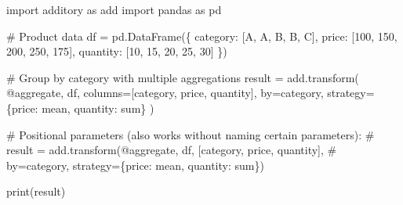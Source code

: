 \documentclass[
  letterpaper,
]{scrbook}
\newenvironment{Shaded}{\begin{snugshade}}{\end{snugshade}}
\newcommand{\BuiltInTok}[1]{\textcolor[rgb]{0.00,0.23,0.31}{#1}}
\newcommand{\CommentTok}[1]{\textcolor[rgb]{0.37,0.37,0.37}{#1}}
\newcommand{\DecValTok}[1]{\textcolor[rgb]{0.68,0.00,0.00}{#1}}
\newcommand{\ImportTok}[1]{\textcolor[rgb]{0.00,0.46,0.62}{#1}}
\newcommand{\NormalTok}[1]{\textcolor[rgb]{0.00,0.23,0.31}{#1}}
\newcommand{\OperatorTok}[1]{\textcolor[rgb]{0.37,0.37,0.37}{#1}}
\newcommand{\StringTok}[1]{\textcolor[rgb]{0.13,0.47,0.30}{#1}}
\begin{document}
\begin{Shaded}
\begin{Highlighting}[]
\ImportTok{import}\NormalTok{ additory }\ImportTok{as}\NormalTok{ add}
\ImportTok{import}\NormalTok{ pandas }\ImportTok{as}\NormalTok{ pd}

\CommentTok{\# Product data}
\NormalTok{df }\OperatorTok{=}\NormalTok{ pd.DataFrame(\{}
    \StringTok{\textquotesingle{}category\textquotesingle{}}\NormalTok{: [}\StringTok{\textquotesingle{}A\textquotesingle{}}\NormalTok{, }\StringTok{\textquotesingle{}A\textquotesingle{}}\NormalTok{, }\StringTok{\textquotesingle{}B\textquotesingle{}}\NormalTok{, }\StringTok{\textquotesingle{}B\textquotesingle{}}\NormalTok{, }\StringTok{\textquotesingle{}C\textquotesingle{}}\NormalTok{],}
    \StringTok{\textquotesingle{}price\textquotesingle{}}\NormalTok{: [}\DecValTok{100}\NormalTok{, }\DecValTok{150}\NormalTok{, }\DecValTok{200}\NormalTok{, }\DecValTok{250}\NormalTok{, }\DecValTok{175}\NormalTok{],}
    \StringTok{\textquotesingle{}quantity\textquotesingle{}}\NormalTok{: [}\DecValTok{10}\NormalTok{, }\DecValTok{15}\NormalTok{, }\DecValTok{20}\NormalTok{, }\DecValTok{25}\NormalTok{, }\DecValTok{30}\NormalTok{]}
\NormalTok{\})}

\CommentTok{\# Group by category with multiple aggregations}
\NormalTok{result }\OperatorTok{=}\NormalTok{ add.transform(}
    \StringTok{\textquotesingle{}@aggregate\textquotesingle{}}\NormalTok{,}
\NormalTok{    df,}
\NormalTok{    columns}\OperatorTok{=}\NormalTok{[}\StringTok{\textquotesingle{}category\textquotesingle{}}\NormalTok{, }\StringTok{\textquotesingle{}price\textquotesingle{}}\NormalTok{, }\StringTok{\textquotesingle{}quantity\textquotesingle{}}\NormalTok{],}
\NormalTok{    by}\OperatorTok{=}\StringTok{\textquotesingle{}category\textquotesingle{}}\NormalTok{,}
\NormalTok{    strategy}\OperatorTok{=}\NormalTok{\{}\StringTok{\textquotesingle{}price\textquotesingle{}}\NormalTok{: }\StringTok{\textquotesingle{}mean\textquotesingle{}}\NormalTok{, }\StringTok{\textquotesingle{}quantity\textquotesingle{}}\NormalTok{: }\StringTok{\textquotesingle{}sum\textquotesingle{}}\NormalTok{\}}
\NormalTok{)}

\CommentTok{\# Positional parameters (also works without naming certain parameters):}
\CommentTok{\# result = add.transform(\textquotesingle{}@aggregate\textquotesingle{}, df, [\textquotesingle{}category\textquotesingle{}, \textquotesingle{}price\textquotesingle{}, \textquotesingle{}quantity\textquotesingle{}], }
\CommentTok{\#                        by=\textquotesingle{}category\textquotesingle{}, strategy=\{\textquotesingle{}price\textquotesingle{}: \textquotesingle{}mean\textquotesingle{}, \textquotesingle{}quantity\textquotesingle{}: \textquotesingle{}sum\textquotesingle{}\})}

\BuiltInTok{print}\NormalTok{(result)}
\end{Highlighting}
\end{Shaded}
\end{document}
